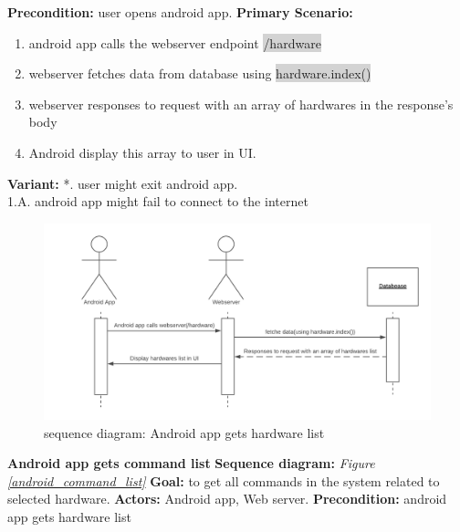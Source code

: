 \documentclass[12pt, oneside, a4paper]{book}
\newcommand{\code}[1]{{\color{red}\colorbox{lightgray}{#1}}}
\newcommand\boldcolor[1]{\textcolor{bold}{\textbf{#1}}}
\begin{document}
				\newline\textbf{Precondition:} user opens android app.
				\newline\textbf{Primary Scenario:}	
				\begin{enumerate}[label*=\arabic*.]
					\item android app calls the webserver endpoint \code{/hardware}
					\item webserver fetches data from database using \code{hardware.index()}
					\item webserver responses to request with an array of hardwares in the response's body
					\item Android display this array to user in UI.
				\end{enumerate}
				\textbf{Variant:}\newline
				\hspace*{5mm}*. user might exit android app. \\
				\hspace*{5mm}1.A. android app might fail to connect to the internet \\
				\begin{figure}[H]
					\includegraphics[width=\linewidth]{img/sequence_android_hw.png}
					\caption{sequence diagram: Android app gets hardware list}
					\label{android_hw}
				\end{figure}
				\newpage\hspace*{-6mm}\boldcolor{Android app gets command list}
				\newline\textbf{Sequence diagram:} \textit{Figure \ref{android_command_list}}
				\newline\textbf{Goal:} to get all commands in the system related to selected hardware.
				\newline\textbf{Actors:} Android app, Web server.
				\newline\textbf{Precondition:} android app gets hardware list
\end{document}

